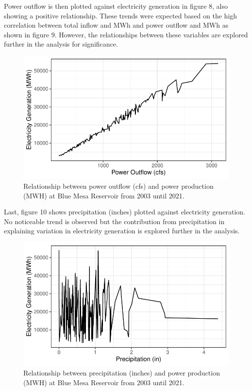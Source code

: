 \documentclass[
  12pt,
]{article}
\begin{document}
Power outflow is then plotted against electricity generation in figure
8, also showing a positive relationship. These trends were expected
based on the high correlation between total inflow and MWh and power
outflow and MWh as shown in figure 9. However, the relationships between
these variables are explored further in the analysis for significance.

\begin{figure}

{\centering \includegraphics{Project_Report_files/figure-latex/MWHxPower-1} 

}

\caption{Relationship between power outflow (cfs) and power production (MWH) at Blue Mesa Reservoir from 2003 until 2021.}\label{fig:MWHxPower}
\end{figure}

Last, figure 10 shows precipitation (inches) plotted against electricity
generation. No noticeable trend is observed but the contribution from
precipitation in explaining variation in electricity generation is
explored further in the analysis.

\begin{figure}

{\centering \includegraphics{Project_Report_files/figure-latex/MWHxPrecip-1} 

}

\caption{Relationship between precipitation (inches) and power production (MWH) at Blue Mesa Reservoir from 2003 until 2021.}\label{fig:MWHxPrecip}
\end{figure}
\end{document}
